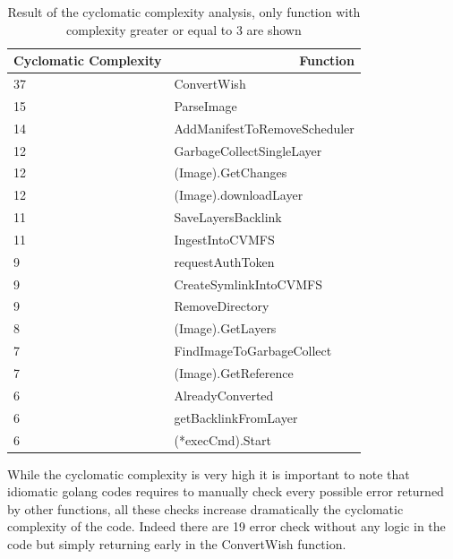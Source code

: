 \begin{table}[]
\begin{tabular}{|l|l|}
\hline
\multicolumn{1}{|r|}{Cyclomatic Complexity} & \multicolumn{1}{r|}{Function} \\ \hline
37 & ConvertWish \\ \hline
15 & ParseImage \\ \hline
14 & AddManifestToRemoveScheduler \\ \hline
12 & GarbageCollectSingleLayer \\ \hline
12 & (Image).GetChanges \\ \hline
12 & (Image).downloadLayer \\ \hline
11 & SaveLayersBacklink \\ \hline
11 & IngestIntoCVMFS \\ \hline
9 & requestAuthToken \\ \hline
9 & CreateSymlinkIntoCVMFS \\ \hline
9 & RemoveDirectory \\ \hline
8 & (Image).GetLayers \\ \hline
7 & FindImageToGarbageCollect \\ \hline
7 & (Image).GetReference \\ \hline
6 & AlreadyConverted \\ \hline
6 & getBacklinkFromLayer \\ \hline
6 & (*execCmd).Start \\ \hline
\end{tabular}
\caption{Result of the cyclomatic complexity analysis, only function with complexity greater or equal to 3 are shown}
\label{tbl:cyclomatic}
\end{table}

While the cyclomatic complexity is very high it is important to note that
idiomatic golang codes requires to manually check every possible error returned
by other functions, all these checks increase dramatically the cyclomatic
complexity of the code. Indeed there are 19 error check without any logic in
the code but simply returning early in the ConvertWish function.



